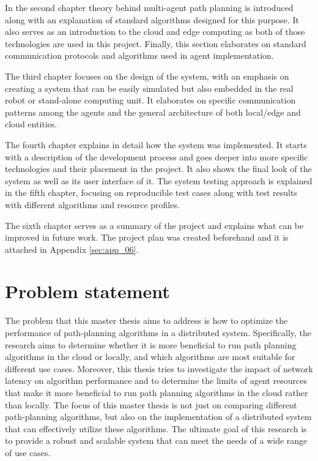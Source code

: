 In the second chapter theory behind multi-agent path planning is introduced along with an explanation of standard algorithms designed for this purpose. It also serves as an introduction to the cloud and edge computing as both of those technologies are used in this project. Finally, this section elaborates on standard communication protocols and algorithms used in agent implementation.

The third chapter focuses on the design of the system, with an emphasis on creating a system that can be easily simulated but also embedded in the real robot or stand-alone computing unit. It elaborates on specific communication patterns among the agents and the general architecture of both local/edge and cloud entities.

The fourth chapter explains in detail how the system was implemented. It starts with a description of the development process and goes deeper into more specific technologies and their placement in the project. It also shows the final look of the system as well as its user interface of it. The system testing approach is explained in the fifth chapter, focusing on reproducible test cases along with test results with different algorithms and resource profiles.

The sixth chapter serves as a summary of the project and explains what can be improved in future work. The project plan was created beforehand and it is attached in Appendix \ref{sec:app_06}. 

\section{Problem statement}
The problem that this master thesis aims to address is how to optimize the performance of path-planning algorithms in a distributed system. Specifically, the research aims to determine whether it is more beneficial to run path planning algorithms in the cloud or locally, and which algorithms are most suitable for different use cases. Moreover, this thesis tries to investigate the impact of network latency on algorithm performance and to determine the limits of agent resources that make it more beneficial to run path planning algorithms in the cloud rather than locally. The focus of this master thesis is not just on comparing different path-planning algorithms, but also on the implementation of a distributed system that can effectively utilize these algorithms. The ultimate goal of this research is to provide a robust and scalable system that can meet the needs of a wide range of use cases.


